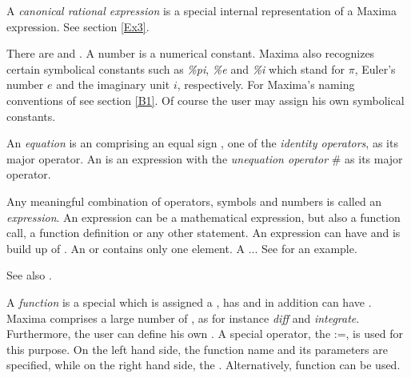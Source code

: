 \documentclass[../Maxima_Workbook.tex]{subfiles}
\begin{document}
\lz A \emph{canonical rational expression} is a special internal representation of a Maxima expression. See section \ref{Ex3}.

\lzz {} 

\lz There are  and . A number is a numerical constant. Maxima also recognizes certain symbolical constants such as \emph{\%pi}, \emph{\%e} and \emph{\%i}  which stand for $ \pi $, Euler's number $ e $ and the imaginary unit $ i $, respectively. For Maxima's naming conventions of  see section \ref{B1}. Of course the user may assign his own symbolical constants.

\lzz {} 

\lz An \emph{equation} is an  comprising an equal sign \hyl{=}{=}, one of the \emph{identity operators}, as its major operator. An  is an expression with the \emph{unequation operator} \# as its major operator.

\lzz {} 

\lz Any meaningful combination of operators, symbols and numbers is called an \emph{expression}. An expression can be a mathematical expression, but also a function call, a function definition or any other statement. An expression can have  and is build up of . An  or  contains only one element. A  ... See  for an example.

\lz See also .

\lzz {} 

\lz A \emph{function} is a special  which is assigned a , has   and in addition can have . Maxima comprises a large number of , as for instance \emph{diff} and \emph{integrate}. Furthermore, the user can define his own . A special operator, the  :=, is used for this purpose. On the left hand side, the function name and its parameters are specified, while on the right hand side, the . Alternatively, function  can be used.
\end{document}
